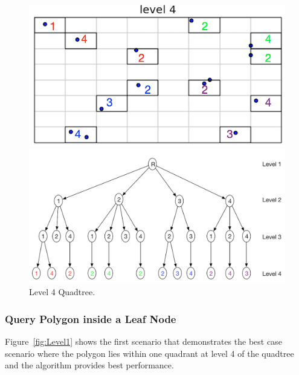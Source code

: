 \begin{figure}[H]
  \centering
  \vspace{0.5in}
  \begin{minipage}[b]{0.35\textwidth}
    \includegraphics[width=\textwidth]{Images/Quadtree_basic_scenario9}
  \end{minipage}
  \hfill
  \begin{minipage}[b]{0.6\textwidth}
    \includegraphics[width=\textwidth]{Images/L4_Tree}
  \end{minipage}
  \vspace{0.5in}
   \caption{Level 4 Quadtree.}
  \label{fig:level4quadtree}
\end{figure}

\clearpage
\subsubsection{Query Polygon inside a Leaf Node}

Figure~\ref{fig:Level1} shows the first scenario that demonstrates the best case scenario where the polygon lies within one quadrant at level 4 of the quadtree and the algorithm provides best performance.

